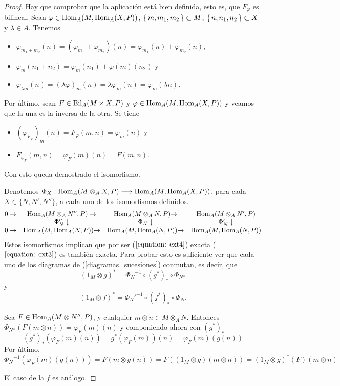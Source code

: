 \documentclass[../main.tex]{subfiles}
\begin{document}
\begin{proof}
	Hay que comprobar que la aplicación está bien definida, esto es, que $F_\varphi$ es bilineal. Sean $\varphi\in\operatorname{Hom}_A(M,\operatorname{Hom}_A(X,P))$, $\set{m,m_1,m_2}\subset M$, $\set{n,n_1,n_2}\subset X$ y $\lambda\in A$. Tenemos
	\begin{itemize}
		\item $\varphi_{m_1+m_2}(n)=(\varphi_{m_1}+\varphi_{m_2})(n)=\varphi_{m_1}(n)+\varphi_{m_2}(n)$,
		\item $\varphi_m(n_1+n_2)=\varphi_m(n_1)+\varphi(m)(n_2)$ y
		\item $\varphi_{\lambda m}(n)=(\lambda\varphi)_m (n)=\lambda \varphi_m (n)=\varphi_m (\lambda n)$.
	\end{itemize}
	Por último, sean $F\in\operatorname{Bil}_A(M\times X,P)$ y $\varphi\in\operatorname{Hom}_A(M,\operatorname{Hom}_A(X,P))$ y veamos que la una es la inversa de la otra. Se tiene
	\begin{itemize}
		\item $(\varphi_{F_\varphi})_m(n)=F_\varphi(m,n)=\varphi_m(n)$ y
		\item $F_{\varphi_F}(m,n)=\varphi_F(m)(n)=F(m,n).$
	\end{itemize}

	Con esto queda demostrado el isomorfismo.

	Denotemos $\Phi_X:\operatorname{Hom}_A(M\otimes_A X,P)\longrightarrow\operatorname{Hom}_A(M,\operatorname{Hom}_A(X,P))$, para cada $X\in\{N,N',N''\}$, a cada uno de los isomorfismos definidos.
	\begin{equation}
	\label{diagramas_sucesiones}
	\begin{matrix}
	0\to&\operatorname{Hom}_A(M\otimes_A N'',P)\to&\operatorname{Hom}_A(M\otimes_A N,P){\to}&\operatorname{Hom}_A(M\otimes_A N',P)\\
	&\Phi_N''\downarrow &\Phi_N\downarrow  &\Phi_N'\downarrow\\
	0\to&\operatorname{Hom}_A(M,\operatorname{Hom}_A(N,P)){\to}&\operatorname{Hom}_A(M,\operatorname{Hom}_A(N,P)){\to}&\operatorname{Hom}_A(M,\operatorname{Hom}_A(N,P))
	\end{matrix}
	\end{equation}
	Estos isomorfismos implican que por ser ($\ref{equation: ext4}$) exacta ($\ref{equation: ext3}$) es también exacta. Para probar esto es suficiente ver que cada uno de los diagramas de (\ref{diagramas_sucesiones}) conmutan, es decir, que
	$$(1_M\otimes g)^*={\Phi_N}^{-1}\circ(g^*)_*\circ\Phi_{N''}$$
	y
	$$(1_M\otimes f)^*={\Phi_N'}^{-1}\circ(f^*)_*\circ\Phi_{N}.$$

	Sea $F\in\operatorname{Hom}_A(M\otimes N'',P)$, y cualquier $m\otimes n\in M\otimes_A N$. Entonces
	$\Phi_{N''}(F(m\otimes n))= \varphi_F(m)(n)$ y componiendo ahora con $(g^*)_*$
	$$(g^*)_*(\varphi_F(m)(n))=g^*(\varphi_F(m))(n)=\varphi_F(m)(g(n))$$
	Por último,
	$${\Phi_N}^{-1}(\varphi_F(m)(g(n)))=F(m\otimes g(n)) =F((1_M\otimes g)(m\otimes n)) =(1_M\otimes g)^* (F)(m\otimes n) $$

	El caso de la $f$ es análogo.
\end{proof}
\end{document}
